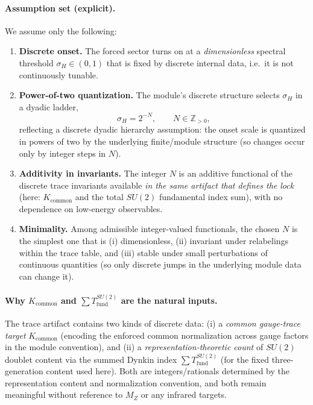 \documentclass[11pt]{article}
\begin{document}
\paragraph{Assumption set (explicit).}
We assume only the following:
\begin{enumerate}
  \item \textbf{Discrete onset.} The forced sector turns on at a \emph{dimensionless} spectral threshold $\sigma_H\in(0,1)$ that is fixed by discrete internal data, i.e.\ it is not continuously tunable.
  \item \textbf{Power-of-two quantization.} The module’s discrete structure selects $\sigma_H$ in a dyadic ladder,
  \begin{equation}
  \sigma_H = 2^{-N},\qquad N\in\mathbb{Z}_{>0},
  \label{eq:dyadic}
  \end{equation}
  reflecting a discrete dyadic hierarchy assumption: the onset scale is quantized in powers of two by the underlying finite/module structure (so changes occur only by integer steps in $N$).
  \item \textbf{Additivity in invariants.} The integer $N$ is an additive functional of the discrete trace invariants available \emph{in the same artifact that defines the lock} (here: $K_{\mathrm{common}}$ and the total $SU(2)$ fundamental index sum), with no dependence on low-energy observables.
  \item \textbf{Minimality.} Among admissible integer-valued functionals, the chosen $N$ is the simplest one that is (i) dimensionless, (ii) invariant under relabelings within the trace table, and (iii) stable under small perturbations of continuous quantities (so only discrete jumps in the underlying module data can change it).
\end{enumerate}

\paragraph{Why $K_{\mathrm{common}}$ and $\sum T_{\mathrm{fund}}^{SU(2)}$ are the natural inputs.}
The trace artifact contains two kinds of discrete data:
(i) a \emph{common gauge-trace target} $K_{\mathrm{common}}$ (encoding the enforced common normalization across gauge factors in the module convention), and
(ii) a \emph{representation-theoretic count} of $SU(2)$ doublet content via the summed Dynkin index $\sum T_{\mathrm{fund}}^{SU(2)}$ (for the fixed three-generation content used here). Both are integers/rationals determined by the representation content and normalization convention, and both remain meaningful without reference to $M_Z$ or any infrared targets.
\end{document}
